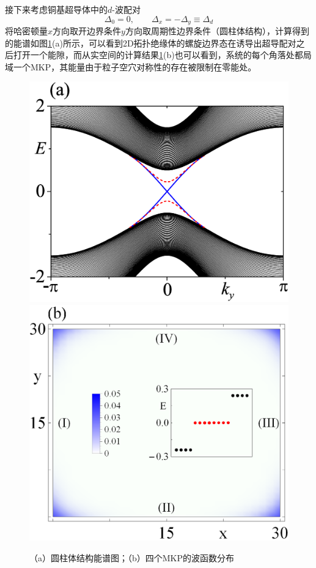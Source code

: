 \qquad 接下来考虑铜基超导体中的$d$-波配对
\begin{equation}
\Delta_0=0,\qquad\Delta_x=-\Delta_y\equiv\Delta_d
\end{equation}
将哈密顿量$x$方向取开边界条件$y$方向取周期性边界条件（圆柱体结构），计算得到的能谱如图\ref{fig9}(a)所示，可以看到2D拓扑绝缘体的螺旋边界态在诱导出超导配对之后打开一个能隙，而从实空间的计算结果\ref{fig9}(b)也可以看到，系统的每个角落处都局域一个MKP，其能量由于粒子空穴对称性的存在被限制在零能处。
\begin{figure}[h]
\centering
\includegraphics[scale=0.26]{pic/fig9}
\includegraphics[scale=0.5]{pic/fig10}
\caption{（a）圆柱体结构能谱图；（b）四个MKP的波函数分布}\label{fig9}
\end{figure}
